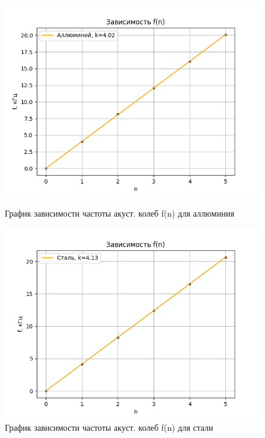 \documentclass[a4paper, 10pt, twocolumn]{article}
\begin{document}
\begin{enumerate}
    \begin{figure}[h]
        \includegraphics[width=1\linewidth]{graphs/figure2.png}
        \begin{center}
            \caption{График зависимости частоты акуст. колеб f(n) для аллюминия}
        \end{center}
        \includegraphics[width=1\linewidth]{graphs/figure3.png}
        \begin{center}
            \caption{График зависимости частоты акуст. колеб f(n) для стали}
        \end{center}
    \end{figure}


\end{enumerate}
\end{document}
